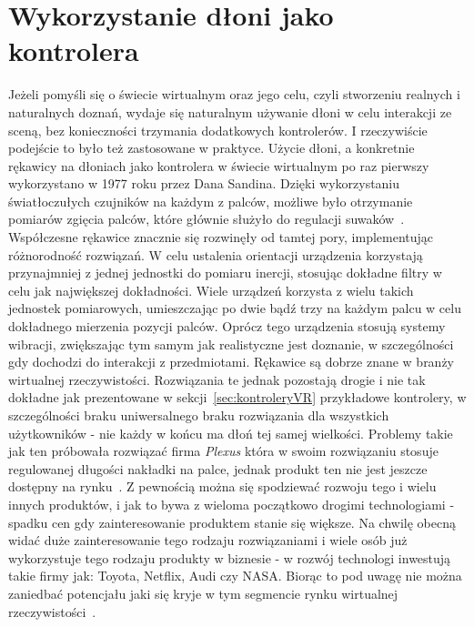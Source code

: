 \section{Wykorzystanie dłoni jako kontrolera}
\label{sec:historia}
	Jeżeli pomyśli się o świecie wirtualnym oraz jego celu, czyli stworzeniu realnych i naturalnych doznań, wydaje się naturalnym używanie dłoni w celu interakcji ze sceną, bez konieczności trzymania dodatkowych kontrolerów. I rzeczywiście podejście to było też zastosowane w praktyce. Użycie dłoni, a konkretnie rękawicy na dłoniach jako kontrolera w świecie wirtualnym po raz pierwszy wykorzystano w 1977 roku przez Dana Sandina. Dzięki wykorzystaniu światłoczułych czujników na każdym z palców, możliwe było otrzymanie pomiarów zgięcia palców, które głównie służyło do regulacji suwaków~\cite{sayreGlove}. Współczesne rękawice znacznie się rozwinęły od tamtej pory, implementując różnorodność rozwiązań. W celu ustalenia orientacji urządzenia korzystają przynajmniej z jednej jednostki do pomiaru inercji, stosując dokładne filtry w celu jak największej dokładności. Wiele urządzeń korzysta z wielu takich jednostek pomiarowych, umieszczając po dwie bądź trzy na każdym palcu w celu dokładnego mierzenia pozycji palców. Oprócz tego urządzenia stosują systemy wibracji, zwiększając tym samym jak realistyczne jest doznanie, w szczególności gdy dochodzi do interakcji z przedmiotami. Rękawice są dobrze znane w branży wirtualnej rzeczywistości. Rozwiązania te jednak pozostają drogie i nie tak dokładne jak prezentowane w sekcji~\ref{sec:kontroleryVR} przykładowe kontrolery, w szczególności braku uniwersalnego braku rozwiązania dla wszystkich użytkowników - nie każdy w końcu ma dłoń tej samej wielkości. Problemy takie jak ten próbowała rozwiązać firma \textit{Plexus} która w swoim rozwiązaniu stosuje regulowanej długości nakładki na palce, jednak produkt ten nie jest jeszcze dostępny na rynku~\cite{plexus}. Z pewnością można się spodziewać rozwoju tego i wielu innych produktów, i jak to bywa z wieloma początkowo drogimi technologiami - spadku cen gdy zainteresowanie produktem stanie się większe. Na chwilę obecną widać duże zainteresowanie tego rodzaju rozwiązaniami i wiele osób już wykorzystuje tego rodzaju produkty w biznesie - w rozwój technologi inwestują takie firmy jak: Toyota, Netflix, Audi czy NASA. Biorąc to pod uwagę nie można zaniedbać potencjału jaki się kryje w tym segmencie rynku wirtualnej rzeczywistości~\cite{manus}.
	
	
	
	
	
	
	
	
	
	
	
	
	
	
	
	
	
	
	
	
